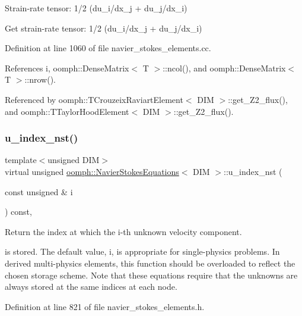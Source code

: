 Strain-\/rate tensor\+: 1/2 (du\+\_\+i/dx\+\_\+j + du\+\_\+j/dx\+\_\+i) 

Get strain-\/rate tensor\+: 1/2 (du\+\_\+i/dx\+\_\+j + du\+\_\+j/dx\+\_\+i) 

Definition at line 1060 of file navier\+\_\+stokes\+\_\+elements.\+cc.



References i, oomph\+::\+Dense\+Matrix$<$ T $>$\+::ncol(), and oomph\+::\+Dense\+Matrix$<$ T $>$\+::nrow().



Referenced by oomph\+::\+T\+Crouzeix\+Raviart\+Element$<$ D\+I\+M $>$\+::get\+\_\+\+Z2\+\_\+flux(), and oomph\+::\+T\+Taylor\+Hood\+Element$<$ D\+I\+M $>$\+::get\+\_\+\+Z2\+\_\+flux().

\mbox{\label{classoomph_1_1NavierStokesEquations_a136756d3e5f4248b32ce44ecfcb5fb30}} 
\subsubsection{\texorpdfstring{u\+\_\+index\+\_\+nst()}{u\_index\_nst()}}
{\footnotesize\ttfamily template$<$unsigned D\+IM$>$ \\
virtual unsigned \hyperlink{classoomph_1_1NavierStokesEquations}{oomph\+::\+Navier\+Stokes\+Equations}$<$ D\+IM $>$\+::u\+\_\+index\+\_\+nst (\begin{DoxyParamCaption}\item[{const unsigned \&}]{i }\end{DoxyParamCaption}) const\hspace{0.3cm}{\ttfamily [inline]}, {\ttfamily [virtual]}}



Return the index at which the i-\/th unknown velocity component. 

is stored. The default value, i, is appropriate for single-\/physics problems. In derived multi-\/physics elements, this function should be overloaded to reflect the chosen storage scheme. Note that these equations require that the unknowns are always stored at the same indices at each node. 

Definition at line 821 of file navier\+\_\+stokes\+\_\+elements.\+h.



